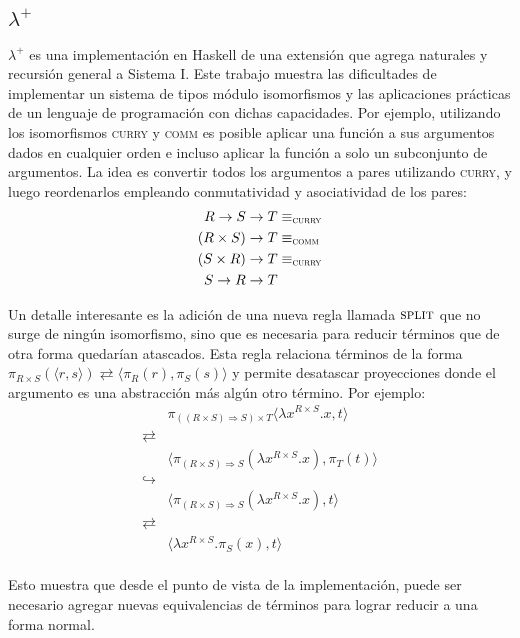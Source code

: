 \subsection{$\lambda^+$}
$\lambda^+$ \cite{lambda-plus} es una implementación en Haskell de una extensión que agrega naturales y recursión general a Sistema I.
Este trabajo muestra las dificultades de implementar un sistema de tipos módulo isomorfismos y las aplicaciones prácticas de un lenguaje de programación con dichas capacidades.
Por ejemplo, utilizando los isomorfismos \textsc{curry} y \textsc{comm} es posible aplicar una función a sus argumentos dados en cualquier orden e incluso aplicar la función a solo un subconjunto de  argumentos.
La idea es convertir todos los argumentos a pares utilizando \textsc{curry}, y luego reordenarlos empleando conmutatividad y asociatividad de los pares:
\begin{align*}
	R \rightarrow S \rightarrow T& \equiv_\textsc{curry} \\
	(R \times S) \rightarrow T& \equiv_\textsc{comm} \\
	(S \times R) \rightarrow T& \equiv_\textsc{curry} \\
	S \rightarrow R \rightarrow T& 
\end{align*}

Un detalle interesante es la adición de una nueva regla llamada $\textsc{split}$ que no surge de ningún isomorfismo, sino que es necesaria para reducir términos que de otra forma quedarían atascados.
Esta regla relaciona términos de la forma
$\pi_{R \times S}(\langle r,s \rangle) \rightleftarrows \langle \pi_R(r), \pi_S(s) \rangle$
y permite desatascar proyecciones donde el argumento es una abstracción más algún otro término.
Por ejemplo:
\begin{align*}
	& \pi_{((R \times S) \Rightarrow S) \times T } \langle \lambda x^{R \times S}.x, t \rangle \\
	\rightleftarrows& \\
	& \langle \pi_{(R \times S) \Rightarrow S}(\lambda x^{R \times S}.x), \pi_T(t) \rangle \\
	\hookrightarrow& \\
	& \langle \pi_{(R \times S) \Rightarrow S}(\lambda x^{R \times S}.x), t \rangle \\
	\rightleftarrows& \\
	& \langle \lambda x^{R \times S}. \pi_S(x) , t \rangle \\
\end{align*}

Esto muestra que desde el punto de vista de la implementación, puede ser necesario agregar nuevas equivalencias de términos para lograr reducir a una forma normal.


